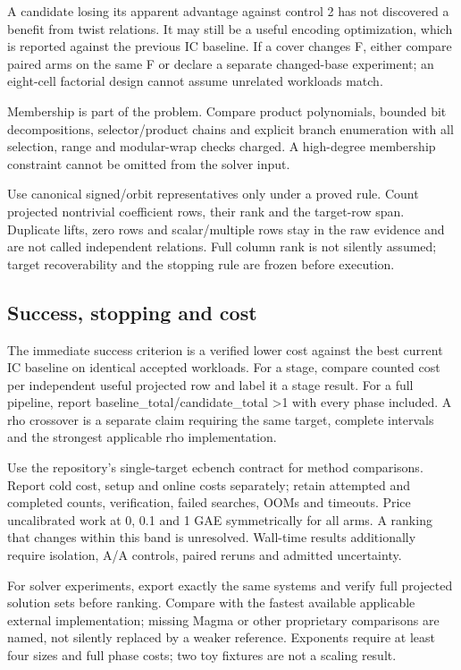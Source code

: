\documentclass[
  10pt,
]{article}
\begin{document}
A candidate losing its apparent advantage against control 2 has not
discovered a benefit from twist relations. It may still be a useful
encoding optimization, which is reported against the previous IC
baseline. If a cover changes F, either compare paired arms on the same F
or declare a separate changed-base experiment; an eight-cell factorial
design cannot assume unrelated workloads match.

Membership is part of the problem. Compare product polynomials, bounded
bit decompositions, selector/product chains and explicit branch
enumeration with all selection, range and modular-wrap checks charged. A
high-degree membership constraint cannot be omitted from the solver
input.

Use canonical signed/orbit representatives only under a proved rule.
Count projected nontrivial coefficient rows, their rank and the
target-row span. Duplicate lifts, zero rows and scalar/multiple rows
stay in the raw evidence and are not called independent relations. Full
column rank is not silently assumed; target recoverability and the
stopping rule are frozen before execution.

\subsection{Success, stopping and cost}\label{success-stopping-and-cost}

The immediate success criterion is a verified lower cost against the
best current IC baseline on identical accepted workloads. For a stage,
compare counted cost per independent useful projected row and label it a
stage result. For a full pipeline, report
baseline\_total/candidate\_total \textgreater1 with every phase
included. A rho crossover is a separate claim requiring the same target,
complete intervals and the strongest applicable rho implementation.

Use the repository's single-target ecbench contract for method
comparisons. Report cold cost, setup and online costs separately; retain
attempted and completed counts, verification, failed searches, OOMs and
timeouts. Price uncalibrated work at 0, 0.1 and 1 GAE symmetrically for
all arms. A ranking that changes within this band is unresolved.
Wall-time results additionally require isolation, A/A controls, paired
reruns and admitted uncertainty.

For solver experiments, export exactly the same systems and verify full
projected solution sets before ranking. Compare with the fastest
available applicable external implementation; missing Magma or other
proprietary comparisons are named, not silently replaced by a weaker
reference. Exponents require at least four sizes and full phase costs;
two toy fixtures are not a scaling result.
\end{document}
